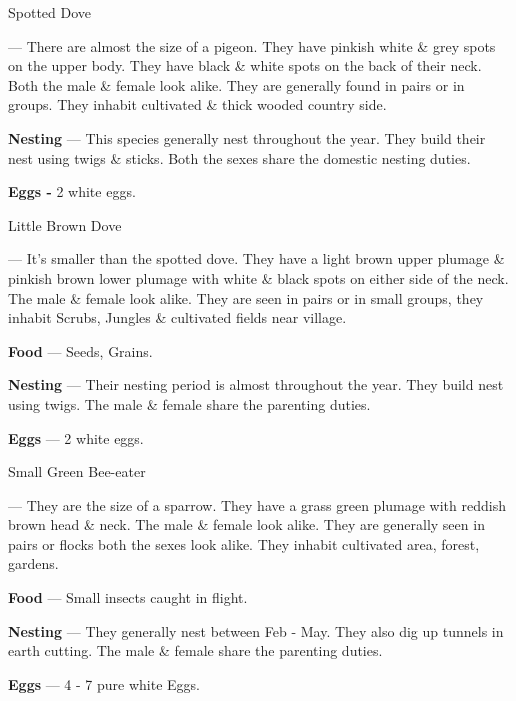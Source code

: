 \begin{bird}{Spotted Dove}

 --- There are almost the size of a pigeon. They have pinkish white \& grey spots on the upper body. They have black \& white spots on the back of their neck. Both the male \& female look alike. They are generally found in pairs or in groups. They inhabit cultivated \& thick wooded country side. 

{\large\bf Nesting} --- This species generally nest throughout the year. They build their nest using twigs \& sticks. Both the sexes share the domestic nesting duties.

{\large\bf Eggs -} 2 white eggs.
\end{bird}

\newpage

\begin{bird}{Little Brown Dove}

 --- It's smaller than the spotted dove. They have a light brown upper plumage \& pinkish brown lower plumage with white \& black spots on either side of the neck. The male \& female look alike. They are seen in pairs or in small groups, they inhabit Scrubs, Jungles \& cultivated fields near village. 

{\large\bf Food} --- Seeds, Grains.

{\large\bf Nesting} --- Their nesting period is almost throughout the year. They build nest using twigs. The male \& female share the parenting duties.

{\large\bf Eggs} --- 2 white eggs.
\end{bird}

\begin{bird}{Small Green Bee-eater}

 --- They are the size of a sparrow. They have a grass green plumage with reddish brown head \& neck. The male \& female look alike. They are generally seen in pairs or flocks both the sexes look alike. They inhabit cultivated area, forest, gardens.

{\large\bf Food} --- Small insects caught in flight.

{\large\bf Nesting} --- They generally nest between Feb - May. They also dig up tunnels in earth cutting. The male \& female share the parenting duties.

{\large\bf Eggs} --- 4 - 7 pure white Eggs.
\end{bird}

